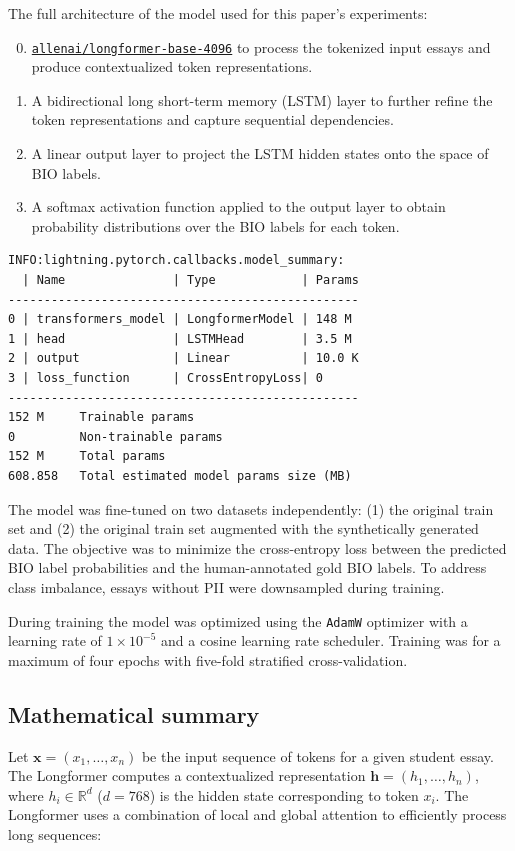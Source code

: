 \documentclass[11pt]{article}
\begin{document}
The full architecture of the model used for this paper's experiments:

\begin{enumerate}
  \setcounter{enumi}{-1}
  \item \href{https://huggingface.co/allenai/longformer-base-4096}{\texttt{allenai/longformer-base-4096}} to process the tokenized input essays and produce contextualized token representations.
  \item A bidirectional long short-term memory (LSTM) layer to further refine the token representations and capture sequential dependencies.
  \item A linear output layer to project the LSTM hidden states onto the space of BIO labels.
  \item A softmax activation function applied to the output layer to obtain probability distributions over the BIO labels for each token.
\end{enumerate}

\begin{lstlisting}
INFO:lightning.pytorch.callbacks.model_summary:
  | Name               | Type            | Params
-------------------------------------------------
0 | transformers_model | LongformerModel | 148 M 
1 | head               | LSTMHead        | 3.5 M 
2 | output             | Linear          | 10.0 K
3 | loss_function      | CrossEntropyLoss| 0     
-------------------------------------------------
152 M     Trainable params
0         Non-trainable params
152 M     Total params
608.858   Total estimated model params size (MB)
\end{lstlisting}

The model was fine-tuned on two datasets independently: (1) the original train set and (2) the original train set augmented with the synthetically generated data. The objective was to minimize the cross-entropy loss between the predicted BIO label probabilities and the human-annotated gold BIO labels. To address class imbalance, essays without PII were downsampled during training.

During training the model was optimized using the \texttt{AdamW} optimizer with a learning rate of $1 \times 10^{-5}$ and a cosine learning rate scheduler. Training was for a maximum of four epochs with five-fold stratified cross-validation.

\subsection{Mathematical summary}
Let $\mathbf{x} = (x_1, \ldots, x_n)$ be the input sequence of tokens for a given student essay. The Longformer computes a contextualized representation $\mathbf{h} = (h_1, \ldots, h_n)$, where $h_i \in \mathbb{R}^d$ ($d=768$) is the hidden state corresponding to token $x_i$. The Longformer uses a combination of local and global attention to efficiently process long sequences:
\end{document}
